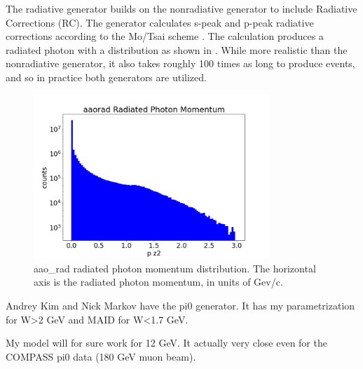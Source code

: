 The radiative generator builds on the nonradiative generator to include Radiative Corrections (RC). The generator calculates s-peak and p-peak radiative corrections according to the Mo/Tsai scheme \parencite{MO1969RadiativeScattering}. The calculation produces a radiated photon with a distribution as shown in . While more realistic than the nonradiative generator, it also takes roughly 100 times as long to produce events, and so in practice both generators are utilized. 


    \begin{figure}
        \centering
        \includegraphics[trim={0 1.25cm 0 2.5cm},clip,width=0.79\textwidth]{Chapters/Ch3-Simulations/event_generation/pics/radiated_photon_momentum.png}
        \caption[aao\_rad radiated photon momentum distribution]{aao\_rad radiated photon momentum distribution. The horizontal axis is the radiated photon momentum, in units of Gev/c.}
        \label{fig:aao_rad_mom_distribution}
    \end{figure}
    
    

\iffalse
Andrey Kim and Nick Markov have the pi0 generator. It has my parametrization for W>2 GeV and MAID for W<1.7 GeV.

My model will for sure work for 12 GeV. It actually very close even for the COMPASS pi0 data (180 GeV muon beam).

